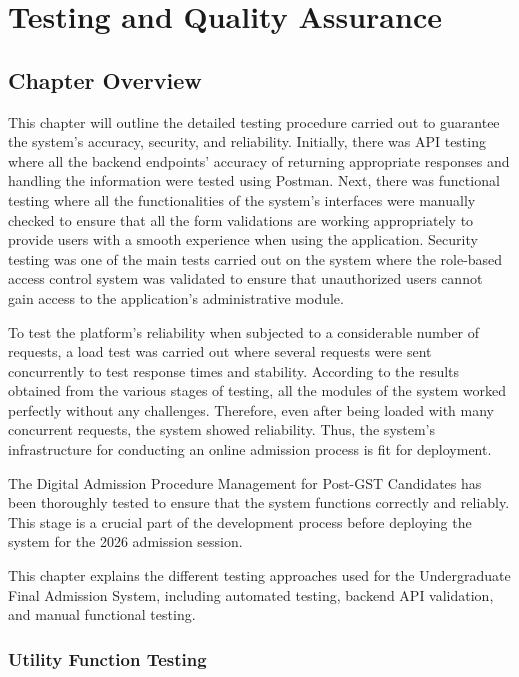 \chapter{Testing and Quality Assurance}

\section{Chapter Overview}

This chapter will outline the detailed testing procedure carried out to guarantee the system's accuracy, security, and reliability. Initially, there was API testing where all the backend endpoints' accuracy of returning appropriate responses and handling the information were tested using Postman. Next, there was functional testing where all the functionalities of the system's interfaces were manually checked to ensure that all the form validations are working appropriately to provide users with a smooth experience when using the application. Security testing was one of the main tests carried out on the system where the role-based access control system was validated to ensure that unauthorized users cannot gain access to the application's administrative module.

\noindent To test the platform's reliability when subjected to a considerable number of requests, a load test was carried out where several requests were sent concurrently to test response times and stability. According to the results obtained from the various stages of testing, all the modules of the system worked perfectly without any challenges. Therefore, even after being loaded with many concurrent requests, the system showed reliability. Thus, the system's infrastructure for conducting an online admission process is fit for deployment.



\setlength{\parindent}{0pt}

The Digital Admission Procedure Management for Post-GST Candidates has been thoroughly tested to ensure that the system functions correctly and reliably. This stage is a crucial part of the development process before deploying the system for the 2026 admission session.

\medskip
This chapter explains the different testing approaches used for the Undergraduate Final Admission System, including automated testing, backend API validation, and manual functional testing.

\subsection{Utility Function Testing}

